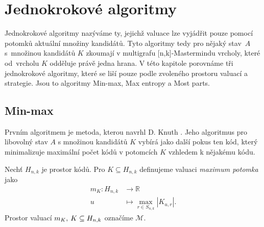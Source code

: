 
\chapter{Jednokrokové algoritmy}
Jednokrokové algoritmy nazýváme ty, jejichž valuace lze vyjádřit pouze pomocí potomků aktuální množiny kandidátů. Tyto algoritmy tedy pro nějaký stav~$A$ s~množinou kandidátů $K$ zkoumají v multigrafu [n,k]-Mastermindu vrcholy, které od~vrcholu $K$ odděluje právě jedna hrana. V této kapitole porovnáme tři jednokrokové algoritmy, které se liší pouze podle zvoleného prostoru valuací a strategie. Jsou to algoritmy Min-max, Max entropy a Most parts. 







\section{Min-max}
Prvním algoritmem je metoda, kterou navrhl D. Knuth \cite{donald_e__knuth_1977}. Jeho algoritmus pro libovolný stav $A$ s množinou kandidátů $K$ vybírá jako další pokus ten kód, který minimalizuje maximální počet kódů v potomcích $K$ vzhledem k nějakému kódu. 
\begin{definice}
    Nechť $H_{n,k}$ je prostor kódů. Pro $K \subseteq H_{n,k}$ definujeme valuaci \emph{maximum potomka} jako
    \begin{align*}
        m_K \colon H_{n,k} &\to \mathbb{R} \\
        u &\mapsto \max_{r\in S_{n,k}} |K_{u,r}|.
    \end{align*}
    Prostor valuací $m_K, \hspace{2px} K \subseteq H_{n,k}$ označíme $\mathcal{M}$. 
\end{definice}

